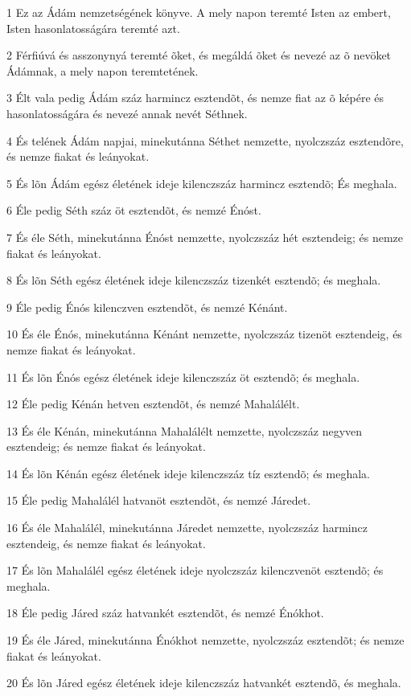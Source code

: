 \par 1 Ez az Ádám nemzetségének könyve. A mely napon teremté Isten az embert, Isten hasonlatosságára teremté azt.
\par 2 Férfiúvá és asszonynyá teremté õket, és megáldá õket és nevezé az õ nevöket Ádámnak, a mely napon teremtetének.
\par 3 Élt vala pedig Ádám száz harmincz esztendõt, és nemze fiat az õ képére és hasonlatosságára és nevezé annak nevét Séthnek.
\par 4 És telének Ádám napjai, minekutánna Séthet nemzette, nyolczszáz esztendõre, és nemze fiakat és leányokat.
\par 5 És lõn Ádám egész életének ideje kilenczszáz harmincz esztendõ; És meghala.
\par 6 Éle pedig Séth száz öt esztendõt, és nemzé Énóst.
\par 7 És éle Séth, minekutánna Énóst nemzette, nyolczszáz hét esztendeig; és nemze fiakat és leányokat.
\par 8 És lõn Séth egész életének ideje kilenczszáz tizenkét esztendõ; és meghala.
\par 9 Éle pedig Énós kilenczven esztendõt, és nemzé Kénánt.
\par 10 És éle Énós, minekutánna Kénánt nemzette, nyolczszáz tizenöt esztendeig, és nemze fiakat és leányokat.
\par 11 És lõn Énós egész életének ideje kilenczszáz öt esztendõ; és meghala.
\par 12 Éle pedig Kénán hetven esztendõt, és nemzé Mahalálélt.
\par 13 És éle Kénán, minekutánna Mahalálélt nemzette, nyolczszáz negyven esztendeig; és nemze fiakat és leányokat.
\par 14 És lõn Kénán egész életének ideje kilenczszáz tíz esztendõ; és meghala.
\par 15 Éle pedig Mahalálél hatvanöt esztendõt, és nemzé Járedet.
\par 16 És éle Mahalálél, minekutánna Járedet nemzette, nyolczszáz harmincz esztendeig, és nemze fiakat és leányokat.
\par 17 És lõn Mahalálél egész életének ideje nyolczszáz kilenczvenöt esztendõ; és meghala.
\par 18 Éle pedig Járed száz hatvankét esztendõt, és nemzé Énókhot.
\par 19 És éle Járed, minekutánna Énókhot nemzette, nyolczszáz esztendõt; és nemze fiakat és leányokat.
\par 20 És lõn Járed egész életének ideje kilenczszáz hatvankét esztendõ, és meghala.
